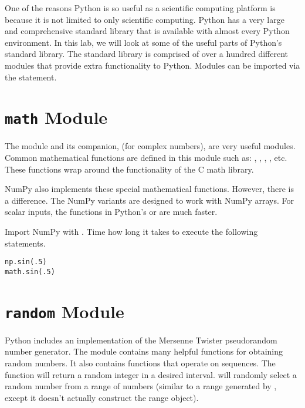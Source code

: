 
One of the reasons Python is so useful as a scientific computing platform is because it is not limited to only scientific computing.
Python has a very large and comprehensive standard library that is available with almost every Python environment.
In this lab, we will look at some of the useful parts of Python's standard library.
The standard library is comprised of over a hundred different modules that provide extra functionality to Python.
Modules can be imported via the  statement.

\section*{\texttt{math} Module}
The  module and its companion,  (for complex numbers), are very useful modules.
Common mathematical functions are defined in this module such as: , , , , etc.  These functions wrap around the functionality of the C math library.

\begin{problem}
NumPy also implements these special mathematical functions.
However, there is a difference.
The NumPy variants are designed to work with NumPy arrays.
For scalar inputs, the functions in Python's  or  are much faster.

Import NumPy with .
Time how long it takes to execute the following statements.
\begin{lstlisting}
np.sin(.5)
math.sin(.5)
\end{lstlisting}
\end{problem}

\section*{\texttt{random} Module}
Python includes an implementation of the Mersenne Twister pseudorandom number generator.
The  module contains many helpful functions for obtaining random numbers.
It also contains functions that operate on sequences.
The  function will return a random integer in a desired interval.  
 will randomly select a random number from a range of numbers (similar to a range generated by , except it doesn't actually construct the range object).

